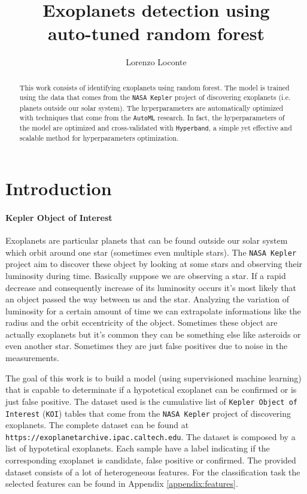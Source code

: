 \documentclass[11pt, a4paper]{article}
\date{}
\title{Exoplanets detection using \\ auto-tuned random forest}
\author{Lorenzo Loconte}
\begin{document}
\maketitle
\begin{abstract}
  This work consists of identifying exoplanets using random forest.
  The model is trained using the data that comes from the \texttt{NASA Kepler} project of discovering exoplanets (i.e. planets outside our solar system).
  The hyperparameters are automatically optimized with techniques that come from the \texttt{AutoML} research.
  In fact, the hyperparameters of the model are optimized and cross-validated with \texttt{Hyperband}, a simple yet effective and scalable method for hyperparameters optimization.
\end{abstract}

\section{Introduction}
  \paragraph{Kepler Object of Interest}
    Exoplanets are particular planets that can be found outside our solar system which orbit around one star (sometimes even multiple stars).
    The \texttt{NASA Kepler} project aim to discover these object by looking at some stars and observing their luminosity during time.
    Basically suppose we are observing a star.
    If a rapid decrease and consequently increase of its luminosity occurs it's most likely that an object passed the way between us and the star.
    Analyzing the variation of luminosity for a certain amount of time we can extrapolate informations like the radius and the orbit eccentricity of the object.
    Sometimes these object are actually exoplanets but it's common they can be something else like asteroids or even another star.
    Sometimes they are just false positives due to noise in the measurements.

    The goal of this work is to build a model (using supervisioned machine learning) that is capable to determinate if a hypotetical exoplanet can be confirmed or is just false positive.
    The dataset used is the cumulative list of \texttt{Kepler Object of Interest} (\texttt{KOI}) tables that come from the \texttt{NASA Kepler} project of discovering exoplanets.
    The complete dataset can be found at \texttt{https://exoplanetarchive.ipac.caltech.edu}.
    The dataset is composed by a list of hypotetical exoplanets.
    Each sample have a label indicating if the corresponding exoplanet is candidate, false positive or confirmed.
    The provided dataset consists of a lot of heterogeneous features.
    For the classification task the selected features can be found in Appendix \ref{appendix:features}.
    
\end{document}
